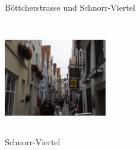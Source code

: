 \begin{figure}[t]
   \centering
   \quad
   \quad
   \quad
   \caption[Böttcherstrasse und Schnorr-Viertel]{Böttcherstrasse und Schnorr-Viertel}
\end{figure}


\begin{figure} 
  \begin{centering}
    \includegraphics[width=0.4\textwidth, height=5cm, keepaspectratio]{../Bilder/Sylt/21.png}
    \caption{Schnorr-Viertel}
  \end{centering}
\end{figure} 

